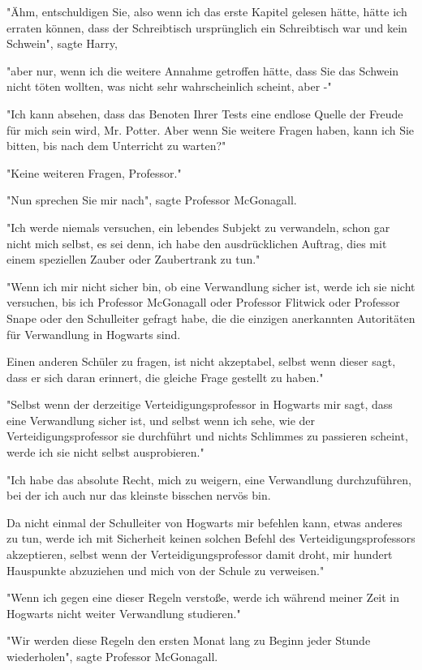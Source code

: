 {"Ähm, entschuldigen Sie, also wenn ich das erste Kapitel gelesen hätte, hätte ich erraten können, dass der Schreibtisch ursprünglich ein Schreibtisch war und kein Schwein", sagte Harry,

"aber nur, wenn ich die weitere Annahme getroffen hätte, dass Sie das Schwein nicht töten wollten, was nicht sehr wahrscheinlich scheint, aber -"

"Ich kann absehen, dass das Benoten Ihrer Tests eine endlose Quelle der Freude für mich sein wird, Mr. Potter. Aber wenn Sie weitere Fragen haben, kann ich Sie bitten, bis nach dem Unterricht zu warten?"

"Keine weiteren Fragen, Professor."

"Nun sprechen Sie mir nach", sagte Professor McGonagall.

"Ich werde niemals versuchen, ein lebendes Subjekt zu verwandeln, schon gar nicht mich selbst, es sei denn, ich habe den ausdrücklichen Auftrag, dies mit einem speziellen Zauber oder Zaubertrank zu tun."

"Wenn ich mir nicht sicher bin, ob eine Verwandlung sicher ist, werde ich sie nicht versuchen, bis ich Professor McGonagall oder Professor Flitwick oder Professor Snape oder den Schulleiter gefragt habe, die die einzigen anerkannten Autoritäten für Verwandlung in Hogwarts sind.

Einen anderen Schüler zu fragen, ist nicht akzeptabel, selbst wenn dieser sagt, dass er sich daran erinnert, die gleiche Frage gestellt zu haben."

"Selbst wenn der derzeitige Verteidigungsprofessor in Hogwarts mir sagt, dass eine Verwandlung sicher ist, und selbst wenn ich sehe, wie der Verteidigungsprofessor sie durchführt und nichts Schlimmes zu passieren scheint, werde ich sie nicht selbst ausprobieren."

"Ich habe das absolute Recht, mich zu weigern, eine Verwandlung durchzuführen, bei der ich auch nur das kleinste bisschen nervös bin.

Da nicht einmal der Schulleiter von Hogwarts mir befehlen kann, etwas anderes zu tun, werde ich mit Sicherheit keinen solchen Befehl des Verteidigungsprofessors akzeptieren, selbst wenn der Verteidigungsprofessor damit droht, mir hundert Hauspunkte abzuziehen und mich von der Schule zu verweisen."

"Wenn ich gegen eine dieser Regeln verstoße, werde ich während meiner Zeit in Hogwarts nicht weiter Verwandlung studieren."

"Wir werden diese Regeln den ersten Monat lang zu Beginn jeder Stunde wiederholen", sagte Professor McGonagall.

}
